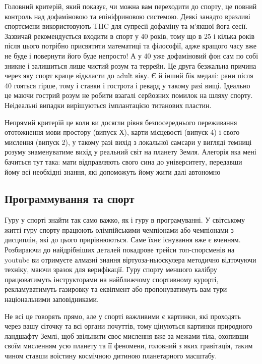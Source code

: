 Головний критерій, який показує, чи можна вам
переходити до спорту, це повний контроль над
дофаміновою та епініфриновою системою. Деякі
занадто вразливі спортсмени використовують THC
для супресії дофаміну та м'якшої йога-сесії.
Зазвичай рекомендується входити в спорт у 40
років, тому що в 25 і кілька років після цього
потрібно присвятити математиці та філософії,
адже кращого часу вже не буде і повернути його
буде непросто! А у 40 уже дофаміновий фон сам
по собі зникне і залишиться лише чистий розум
та террейн. Це друга безжальна причина через
яку спорт краще відкласти до adult віку. Є й
інший бік медалі: рани після 40 гояться гірше,
тому і ставки і гострота і ревард у такому разі
вищі. Ідеально це маючи гострий розум не робити
взагалі серйозних помилок на шляху спорту.
Неідеальні випадки вирішуються імплантацією
титанових пластин.

Непрямий критерій це коли ви досягли рівня
безпосереднього переживання ототожнення мови
простору (випуск Х), карти місцевості (випуск 4)
і свого мислення (випуск 2), у такому разі вихід
з локальної самсари у вигляді темниці розуму
знаменуватиме вихід у реальний світ на планету
Земля. Алегорія яка мені бачиться тут така: мати
відправляють свого сина до університету, передавши
йому всі необхідні знання, які допоможуть йому жити
далі автономно

\subsection{Программування та спорт}

Гуру у спорті знайти так само важко, як і гуру в
програмуванні. У світському житті гуру спорту
працюють олімпійськими чемпіонами або чемпіонами
з дисциплін, які до цього прирівнюються. Саме їхнє
існування вже є вченням. Розбираючи до найдрібніших
деталей покадрове трейси топ-спорсменів на youtube
ви отримуєте алмазні знання віртуоза-ньюскулера
методично відточуючи техніку, маючи зразок для
верифікації. Гуру спорту меншого калібру працюватимуть
інструкторами на найближчому спортивному курорті,
рекламуватимуть газировку та еквіпмент або
пропонуватимуть вам тури національними заповідниками.

Не всі це говорять прямо, але у спорті важливими
є картинки, які проходять через вашу сіточку та
всі органи почуттів, тому цінуються картинки
природного ландшафту Землі, щоб звільнити своє
мислення вже за межами тіла, охопивши своїм
мисленням усю планету та її феномени, головний
з яких гравітація, таким чином ставши воістину
космічною дитиною планетарного масштабу.

